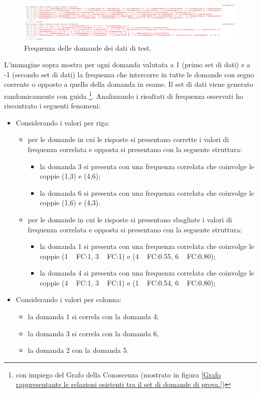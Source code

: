 \noindent
\begin{figure}[H]
\centering
	\includegraphics[width=1\linewidth]{./image/res_frequenceMatrix_OSS.png}
	\caption{Frequenza delle domande dei dati di test.}
	\label{Frequenza delle domande dei dati di test.}
\end{figure}
L'immagine sopra mostra per ogni domanda valutata a 1 (primo set di dati) e a -1 (secondo set di dati) la frequenza che intercorre in tutte le domande con segno coerente o opposto a quello della domanda in esame.
Il set di dati viene generato randomicamente con guida \footnote{con impiego del Grafo della Conoscenza (mostrato in figura \ref{Grafo rappresentante le relazioni esistenti tra il set di domande di prova.})}.
Analizzando i risultati di frequenza osservati ho riscontrato i seguenti fenomeni:
\begin{itemize}
\item Considerando i valori per riga:
\begin{itemize}
\item per le domande in cui le risposte si presentano corrette i valori di frequenza correlata e opposta si presentano con la seguente struttura:
\begin{itemize}
\item la domanda 3  si presenta con una frequenza correlata che coinvolge le coppie (1,3) e (4,6);
\item la domanda 6 si presenta con una frequenza correlata che coinvolge le coppie (1,6) e (4,3).
\end{itemize}
\item per le domande in cui le risposte si presentano sbagliate i valori di frequenza correlata e opposta si presentano con la seguente struttura:
\begin{itemize}
\item la domanda 1 si presenta con una frequenza correlata che coinvolge le coppie (1 ~ FC:1, 3 ~ FC:1) e (4 ~ FC:0.55, 6 ~ FC:0.80);
\item la domanda 4 si presenta con una frequenza correlata che coinvolge le coppie (4 ~ FC:1, 3 ~ FC:1) e (1 ~ FC:0.54, 6 ~ FC:0.80);
\end{itemize}
\end{itemize}
\item Considerando i valori per colonna:
\begin{itemize}
\item la domanda 1 si correla con la domanda 4;
\item la domanda 3 si correla con la domanda 6, 
\item la domanda 2 con la domanda 5.
\end{itemize}
\end{itemize}
